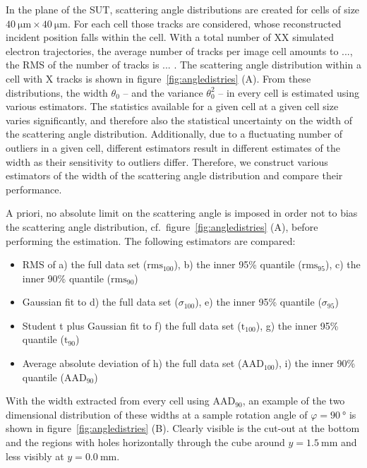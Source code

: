 \documentclass{PoS}
\newcommand{\rmshundred}{\ensuremath{\textrm{rms}_\textrm{100}}}
\newcommand{\rmsninetyfive}{\ensuremath{\textrm{rms}_\textrm{95}}}
\newcommand{\rmsninety}{\ensuremath{\textrm{rms}_\textrm{90}}}
\newcommand{\gausshundred}{\ensuremath{\sigma_\textrm{100}}}
\newcommand{\gaussninety}{\ensuremath{\sigma_\textrm{95}}}
\newcommand{\studhundred}{\ensuremath{\textrm{t}_\textrm{100}}}
\newcommand{\studninety}{\ensuremath{\textrm{t}_\textrm{90}}}
\newcommand{\aadhundred}{\ensuremath{\textrm{AAD}_\textrm{100}}}
\newcommand{\aadninety}{\ensuremath{\textrm{AAD}_\textrm{90}}}
\begin{document}
In the plane of the SUT, scattering angle distributions are created for cells of size $\SI{40}{\um} \times \SI{40}{\um}$. 
For each cell those tracks are considered, whose reconstructed incident position falls within the cell. 
With a total number of XX simulated electron trajectories, the average number of tracks per image cell amounts to ..., the RMS of the number of tracks is ... . %
The scattering angle distribution within a cell with X tracks is shown in figure~\ref{fig:angledistries} (A). %
From these distributions, the width $\theta_0$ -- and the variance $\theta_0^2$ -- in every cell is estimated using various estimators. 
The statistics available for a given cell at a given cell size varies significantly, and therefore also the statistical uncertainty on the width of the scattering angle distribution. 
Additionally, due to a fluctuating number of outliers in a given cell, different estimators result in different estimates of the width as their sensitivity to outliers differ. 
Therefore, we construct various estimators of the width of the scattering angle distribution and compare their performance. 

A priori, no absolute limit on the scattering angle is imposed in order not to bias the scattering angle distribution, cf.\ figure~\ref{fig:angledistries} (A), before performing the estimation. 
The following estimators are compared:
\begin{itemize}\itemsep0pt
 \item RMS of a) the full data set ($\rmshundred$), b) the inner 95\% quantile ($\rmsninetyfive$), c) the inner 90\% quantile ($\rmsninety$)
 \item Gaussian fit to d) the full data set ($\gausshundred$), e) the inner 95\% quantile ($\gaussninety$)
 \item Student t plus Gaussian fit to f) the full data set ($\studhundred$), g) the inner 95\% quantile ($\studninety$)
 \item Average absolute deviation of h) the full data set ($\aadhundred$), i) the inner 90\% quantile ($\aadninety$)
 
\end{itemize}

With the width extracted from every cell using $\aadninety$,
 an example of the two dimensional distribution of these widths at a sample rotation angle of $\varphi = \SI{90}{\degree}$ is shown in figure~\ref{fig:angledistries} (B). 
Clearly visible is the cut-out at the bottom and the regions with holes horizontally through the cube around $y=\SI{1.5}{\mm}$ and less visibly at $y=\SI{0.0}{\mm}$.
\end{document}
